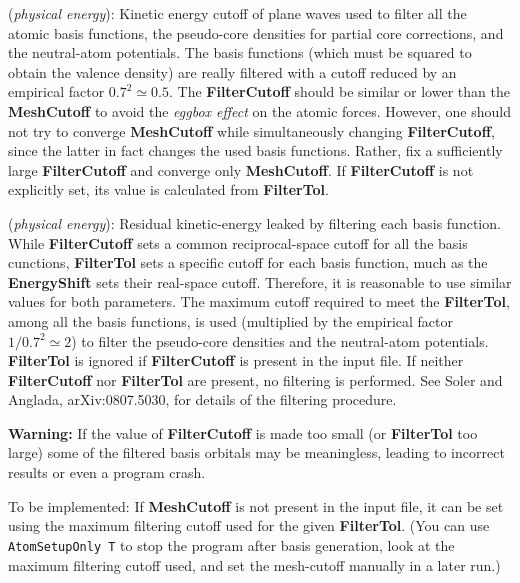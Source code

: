 \documentclass[11pt]{article}
\begin{document}
\begin{description}
\itemsep 10pt
\parsep 0pt

\item[{\bf FilterCutoff}] ({\it physical energy}):
Kinetic energy cutoff of plane waves used to filter all the 
atomic basis functions, the pseudo-core densities 
for partial core corrections, and the neutral-atom potentials. 
The basis functions (which must be squared to obtain the
valence density) are really filtered with a cutoff reduced by an
empirical factor $0.7^2 \simeq 0.5$. The \textbf{FilterCutoff} should 
be similar or lower than the \textbf{MeshCutoff} to avoid the
{\it eggbox effect} on the atomic forces. 
However, one should
not try to converge \textbf{MeshCutoff} while simultaneously 
changing \textbf{FilterCutoff}, since the latter in fact changes
the used basis functions. Rather, fix a sufficiently large 
\textbf{FilterCutoff} and converge only \textbf{MeshCutoff}.
If \textbf{FilterCutoff} is not explicitly set, its value is 
calculated from \textbf{FilterTol}.

\item[{\bf FilterTol}] ({\it physical energy}):
Residual kinetic-energy leaked by filtering each basis function.
While \textbf{FilterCutoff} sets a common reciprocal-space cutoff 
for all the basis cunctions, \textbf{FilterTol} sets a specific 
cutoff for each basis function, much as the \textbf{EnergyShift} 
sets their real-space cutoff. Therefore,
it is reasonable to use similar values for both parameters.
The maximum cutoff required to meet the \textbf{FilterTol},
among all the basis functions, is used (multiplied by the 
empirical factor $1/0.7^2 \simeq 2$) to filter the pseudo-core 
densities and the neutral-atom potentials. \textbf{FilterTol} is ignored if 
\textbf{FilterCutoff} is present in the input file.
If neither \textbf{FilterCutoff} nor \textbf{FilterTol} are
present, no filtering is performed.
See Soler and Anglada, arXiv:0807.5030, for details of the 
filtering procedure.

{\bf Warning:} If the value of \textbf{FilterCutoff} is
made too small (or \textbf{FilterTol} too large) some of
the filtered basis orbitals may be meaningless, leading to
incorrect results or even a program crash.

To be implemented: If \textbf{MeshCutoff} is not present in the input
file, it can be set using the maximum filtering cutoff used for the
given \textbf{FilterTol}. (You can use {\tt AtomSetupOnly T} to stop
the program after basis generation, look at the maximum filtering
cutoff used, and set the mesh-cutoff manually in a later run.)

\end{description}
\end{document}

